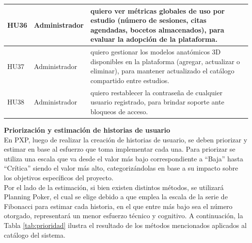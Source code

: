\documentclass[12pt,letterpaper,oneside]{report}
\newcommand{\tituloparpegado}[1]{\par\textbf{#1}\\\indent\ignorespaces}
\begin{document}
\begin{longtable}{|l|p{3.5cm}|p{9.5cm}|}
  HU36 & Administrador & quiero ver métricas globales de uso por estudio (número de sesiones, citas agendadas, bocetos almacenados), para evaluar la adopción de la plataforma. \\ \hline
  HU37 & Administrador & quiero gestionar los modelos anatómicos 3D disponibles en la plataforma (agregar, actualizar o eliminar), para mantener actualizado el catálogo compartido entre estudios. \\ \hline
  HU38 & Administrador & quiero restablecer la contraseña de cualquier usuario registrado, para brindar soporte ante bloqueos de acceso. \\
\end{longtable}

\tituloparpegado{Priorización y estimación de historias de usuario}
En PXP, luego de realizar la creación de historias de usuario, se deben priorizar y estimar en base al esfuerzo que toma implementar cada una. Para priorizar se utiliza una escala que va desde el valor más bajo correspondiente a ``Baja'' hasta ``Crítica'' siendo el valor más alto, categorizándolas en base a su impacto sobre los objetivos específicos del proyecto.\\
\indent Por el lado de la estimación, si bien existen distintos métodos, se utilizará Planning Poker\cite{planningpoker}, el cual se elige debido a que emplea la escala de la serie de Fibonacci\cite{viggiani2006} para estimar cada historia, en el que entre más bajo sea el número otorgado, representará un menor esfuerzo técnico y cognitivo. A continuación, la Tabla \ref{tab:prioridad} ilustra el resultado de los métodos mencionados aplicados al catálogo del sistema.
\end{document}
